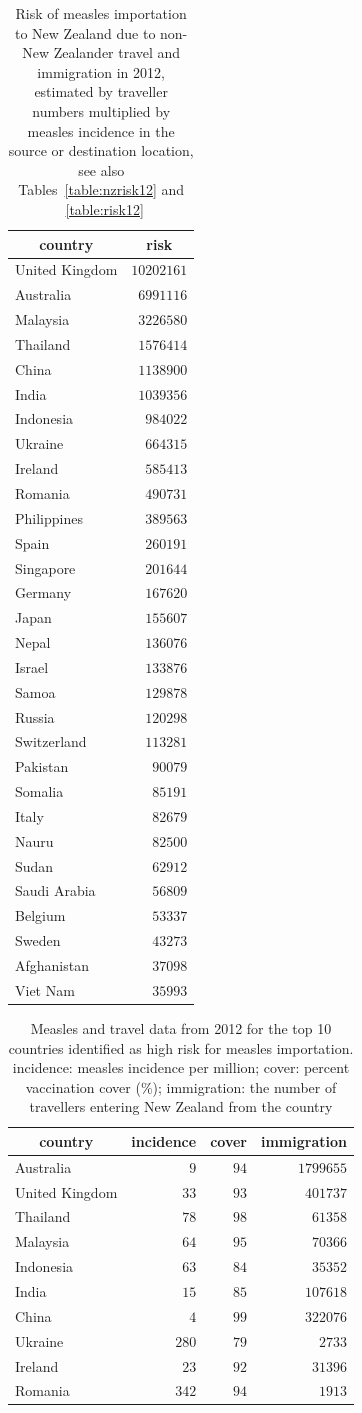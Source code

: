 \documentclass{article}
\begin{document}
\begin{table}
\caption{Risk of measles importation to New Zealand due to non-New Zealander travel and immigration in 2012, estimated by traveller numbers multiplied by measles incidence in the source or destination location, see also Tables~\autoref{table:nzrisk12} and ~\autoref{table:risk12}}
\begin{center}
\begin{tabular}{lr}
\hline\hline
\multicolumn{1}{c}{country}&\multicolumn{1}{c}{risk}\tabularnewline
\hline
United Kingdom&$10202161$\tabularnewline
Australia&$ 6991116$\tabularnewline
Malaysia&$ 3226580$\tabularnewline
Thailand&$ 1576414$\tabularnewline
China&$ 1138900$\tabularnewline
India&$ 1039356$\tabularnewline
Indonesia&$  984022$\tabularnewline
Ukraine&$  664315$\tabularnewline
Ireland&$  585413$\tabularnewline
Romania&$  490731$\tabularnewline
Philippines&$  389563$\tabularnewline
Spain&$  260191$\tabularnewline
Singapore&$  201644$\tabularnewline
Germany&$  167620$\tabularnewline
Japan&$  155607$\tabularnewline
Nepal&$  136076$\tabularnewline
Israel&$  133876$\tabularnewline
Samoa&$  129878$\tabularnewline
Russia&$  120298$\tabularnewline
Switzerland&$  113281$\tabularnewline
Pakistan&$   90079$\tabularnewline
Somalia&$   85191$\tabularnewline
Italy&$   82679$\tabularnewline
Nauru&$   82500$\tabularnewline
Sudan&$   62912$\tabularnewline
Saudi Arabia&$   56809$\tabularnewline
Belgium&$   53337$\tabularnewline
Sweden&$   43273$\tabularnewline
Afghanistan&$   37098$\tabularnewline
Viet Nam&$   35993$\tabularnewline
\hline
\end{tabular}\end{center}\label{table:imrisk12}
\end{table}


\begin{table}
\caption{Measles and travel data from 2012 for the top 10 countries identified as high risk for measles importation. incidence: measles incidence per million; cover: percent vaccination cover (\%); immigration: the number of travellers entering New Zealand from the country}
\begin{center}
\begin{tabular}{lrrr}
\hline\hline
\multicolumn{1}{c}{country}&\multicolumn{1}{c}{incidence}&\multicolumn{1}{c}{cover}&\multicolumn{1}{c}{immigration}\tabularnewline
\hline
Australia&$  9$&$94$&$1799655$\tabularnewline
United Kingdom&$ 33$&$93$&$ 401737$\tabularnewline
Thailand&$ 78$&$98$&$  61358$\tabularnewline
Malaysia&$ 64$&$95$&$  70366$\tabularnewline
Indonesia&$ 63$&$84$&$  35352$\tabularnewline
India&$ 15$&$85$&$ 107618$\tabularnewline
China&$  4$&$99$&$ 322076$\tabularnewline
Ukraine&$280$&$79$&$   2733$\tabularnewline
Ireland&$ 23$&$92$&$  31396$\tabularnewline
Romania&$342$&$94$&$   1913$\tabularnewline
\hline
\end{tabular}\end{center}\label{table:toprisk}
\end{table}
\end{document}
